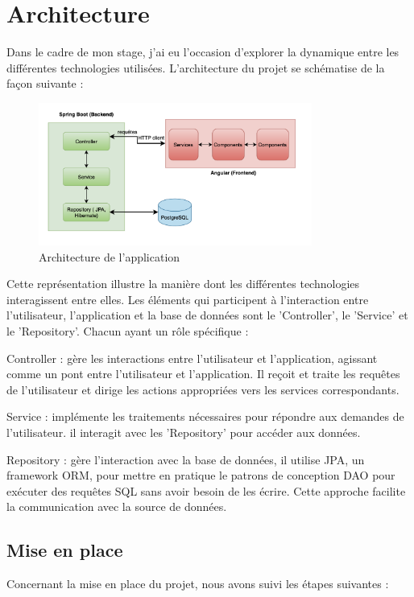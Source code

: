 \newpage

\section{Architecture}
Dans le cadre de mon stage, j'ai eu l'occasion d'explorer la dynamique entre les différentes technologies utilisées. L'architecture du projet se schématise de la façon suivante :
\medskip

\begin{figure}[h!]
    \centering
    \includegraphics[width=0.8\textwidth]{images/diagramme/archi.png}
    \caption{Architecture de l'application}
\end{figure}
\medskip

Cette représentation illustre la manière dont les différentes technologies interagissent entre elles. Les éléments qui participent à l'interaction entre l'utilisateur, l'application et la base de données sont le 'Controller', le 'Service' et le 'Repository'. Chacun ayant un rôle spécifique :
\medskip

Controller : gère les interactions entre l'utilisateur et l'application, agissant comme un pont entre l'utilisateur et l'application. Il reçoit et traite les requêtes de l'utilisateur et dirige les actions appropriées vers les services correspondants.
\medskip

Service : implémente les traitements nécessaires pour répondre aux demandes de l'utilisateur. il interagit avec les 'Repository' pour accéder aux données. 
\medskip

Repository : gère l'interaction avec la base de données, il utilise JPA, un framework ORM, pour mettre en pratique le patrons de conception DAO pour exécuter des requêtes SQL sans avoir besoin de les écrire. Cette approche facilite la communication avec la source de données.
\medskip

\subsection{Mise en place}
Concernant la mise en place du projet, nous avons suivi les étapes suivantes :
\medskip

